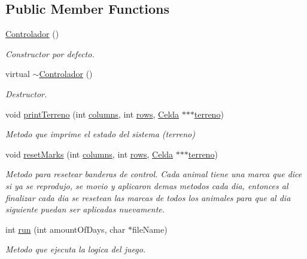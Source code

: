 \subsection*{Public Member Functions}
\begin{DoxyCompactItemize}
\item 
\hyperlink{classControlador_a17db08229680461d4d1a2110a92ccf78}{Controlador} ()
\begin{DoxyCompactList}\small\item\em Constructor por defecto. \end{DoxyCompactList}\item 
virtual \hyperlink{classControlador_a2f1828135645f009d3772de86f12d507}{$\sim$\+Controlador} ()
\begin{DoxyCompactList}\small\item\em Destructor. \end{DoxyCompactList}\item 
void \hyperlink{classControlador_ad658c69aebb54cf6b39393350e1b99e5}{print\+Terreno} (int \hyperlink{classControlador_a2a6b739b562f1c4d295be0e48069c521}{columns}, int \hyperlink{classControlador_af6022ee9e2d20a9d2469df3e91d78029}{rows}, \hyperlink{classCelda}{Celda} $\ast$$\ast$$\ast$\hyperlink{classControlador_a70fb7805ac5552e9ee36d7d3d0653fa2}{terreno})
\begin{DoxyCompactList}\small\item\em Metodo que imprime el estado del sistema (terreno) \end{DoxyCompactList}\item 
void \hyperlink{classControlador_a4b672bdb52609d4ec1debceaed4b57f7}{reset\+Marks} (int \hyperlink{classControlador_a2a6b739b562f1c4d295be0e48069c521}{columns}, int \hyperlink{classControlador_af6022ee9e2d20a9d2469df3e91d78029}{rows}, \hyperlink{classCelda}{Celda} $\ast$$\ast$$\ast$\hyperlink{classControlador_a70fb7805ac5552e9ee36d7d3d0653fa2}{terreno})
\begin{DoxyCompactList}\small\item\em Metodo para resetear banderas de control. Cada animal tiene una marca que dice si ya se reprodujo, se movio y aplicaron demas metodos cada dia, entonces al finalizar cada dia se resetean las marcas de todos los animales para que al dia siguiente puedan ser aplicadas nuevamente. \end{DoxyCompactList}\item 
int \hyperlink{classControlador_a33ea3e8f5c32cd2fcd962da6e7fadf52}{run} (int amount\+Of\+Days, char $\ast$file\+Name)
\begin{DoxyCompactList}\small\item\em Metodo que ejecuta la logica del juego. \end{DoxyCompactList}\end{DoxyCompactItemize}
